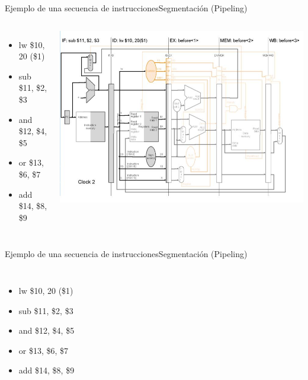 \documentclass[aspectratio=169,compress]{beamer}
\begin{document}
\begin{footnotesize}
\begin{frame}{Ejemplo de una secuencia de instrucciones}{Segmentación (Pipeling)}

 \begin{columns}[onlytextwidth,T]
      \column{\dimexpr\linewidth-110mm-5mm}

\bigskip
\begin{itemize}
\item lw \$10, 20 (\$1)
\item sub \$11, \$2, \$3
\item and \$12, \$4, \$5
\item or \$13, \$6, \$7
\item add \$14, \$8, \$9
\end{itemize}

      \column{100mm}
\includegraphics[scale=0.35]{images/pipeling2.jpg} 
    \end{columns}

\end{frame}


\begin{frame}{Ejemplo de una secuencia de instrucciones}{Segmentación (Pipeling)}

 \begin{columns}[onlytextwidth,T]
      \column{\dimexpr\linewidth-110mm-5mm}

\bigskip
\begin{itemize}
\item lw \$10, 20 (\$1)
\item sub \$11, \$2, \$3
\item and \$12, \$4, \$5
\item or \$13, \$6, \$7
\item add \$14, \$8, \$9
\end{itemize}


\end{columns}
\end{frame}
\end{footnotesize}
\end{document}
